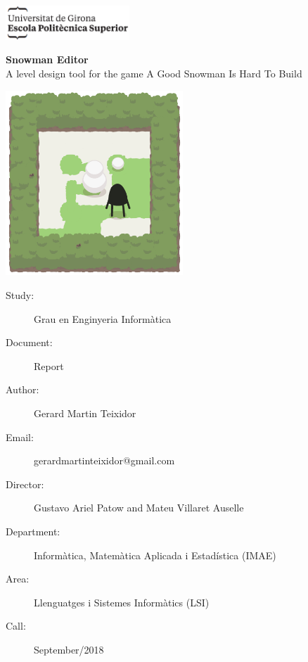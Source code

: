 \documentclass{report}
\theoremstyle{plain}
\begin{document}
\begin{titlepage}
\includegraphics[width=0.35\textwidth]{logo-politecnica.png}

\vspace{3\baselineskip}

\begin{center}
\fontsize{30pt}{30pt}\selectfont \textbf{Snowman Editor} \\ 
\huge A level design tool for the game A Good Snowman Is Hard To Build

\vspace{1\baselineskip}

\includegraphics[width=0.5\textwidth]{game-image.png}
\vspace*{\fill}

\end{center}

\begin{description}
    \item[Study:] Grau en Enginyeria Informàtica
    \item[Document:] Report
    \item[Author:] Gerard Martin Teixidor
    \item[Email:] gerardmartinteixidor@gmail.com
    \item[Director:] Gustavo Ariel Patow and Mateu Villaret Auselle
    \item[Department:] Informàtica, Matemàtica Aplicada i Estadística (IMAE)
    \item[Area:] Llenguatges i Sistemes Informàtics (LSI)
    \item[Call:] September/2018
\end{description}
\end{titlepage}
\end{document}
